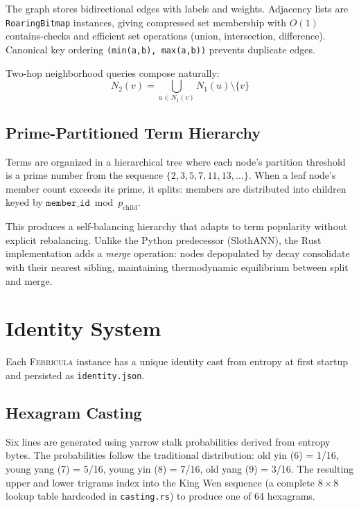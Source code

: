 \documentclass[twocolumn,10pt]{article}
\begin{document}
The graph stores bidirectional edges with labels and weights.
Adjacency lists are \texttt{RoaringBitmap} instances, giving
compressed set membership with $O(1)$ contains-checks and efficient
set operations (union, intersection, difference).  Canonical key
ordering \texttt{(min(a,b), max(a,b))} prevents duplicate edges.

Two-hop neighborhood queries compose naturally:
\begin{equation}
N_2(v) = \bigcup_{u \in N_1(v)} N_1(u) \setminus \{v\}
\end{equation}

\subsection{Prime-Partitioned Term Hierarchy}

Terms are organized in a hierarchical tree where each node's partition
threshold is a prime number from the sequence $\{2, 3, 5, 7, 11,
13, \ldots\}$.  When a leaf node's member count exceeds its prime, it
splits: members are distributed into children keyed by
$\texttt{member\_id} \bmod p_{\text{child}}$.

This produces a self-balancing hierarchy that adapts to term popularity
without explicit rebalancing.  Unlike the Python predecessor
(SlothANN), the Rust implementation adds a \textit{merge} operation:
nodes depopulated by decay consolidate with their nearest sibling,
maintaining thermodynamic equilibrium between split and merge.

\section{Identity System}

Each \textsc{Ferricula} instance has a unique identity cast from entropy
at first startup and persisted as \texttt{identity.json}.

\subsection{Hexagram Casting}

Six lines are generated using yarrow stalk probabilities derived from
entropy bytes.  The probabilities follow the traditional distribution:
old yin (6) = 1/16, young yang (7) = 5/16, young yin (8) = 7/16,
old yang (9) = 3/16.  The resulting upper and lower trigrams index
into the King Wen sequence (a complete $8 \times 8$ lookup table
hardcoded in \texttt{casting.rs}) to produce one of 64 hexagrams.
\end{document}
